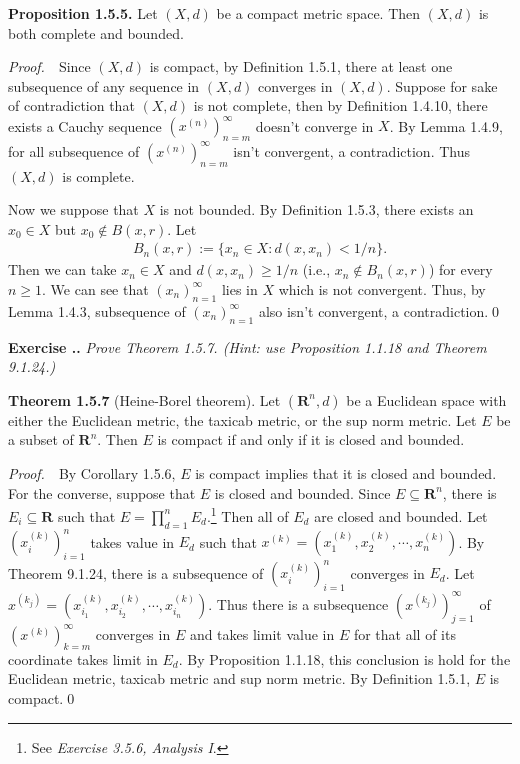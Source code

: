 \documentclass{book}
\newcommand{\pff}{\vspace{.25em}\noindent\emph{Proof.}~~}
\newcommand{\titl}[1]{\noindent\textbf{#1}}
\newcounter{Exercise}[section]
\renewcommand{\theExercise}{\thesection.\arabic{Exercise}.}
\newcommand{\new}{\vspace{1.5em}\noindent\textbf{Exercise \stepcounter{Exercise}\textbf{\theExercise}} }
\begin{document}
\begin{framed}
\titl{Proposition 1.5.5.} Let $(X,d)$ be a compact metric space. Then $(X,d)$ is both complete and bounded.
\end{framed}

\pff Since $(X,d)$ is compact, by Definition 1.5.1, there at least one subsequence of any sequence in $(X,d)$ converges in $(X,d)$. Suppose for sake of contradiction that $(X,d)$ is not complete, then by Definition 1.4.10, there exists a Cauchy sequence $(x^{(n)})_{n=m}^{\infty}$ doesn't converge in $X$. By Lemma 1.4.9, for all subsequence of $(x^{(n)})_{n=m}^{\infty}$ isn't convergent, a contradiction. Thus $(X,d)$ is complete.

Now we suppose that $X$ is not bounded. By Definition 1.5.3, there exists an $x_0\in X$ but $x_0\notin B(x,r)$. Let
    \begin{align*}
        B_n(x,r):=\{x_n\in X:d(x,x_n)<1/n\}.
    \end{align*}
Then we can take $x_n\in X$ and $d(x,x_n)\geq 1/n$ (i.e., $x_n\notin B_n(x,r)$) for every $n\geq 1$. We can see that $(x_n)_{n=1}^{\infty}$ lies in $X$ which is not convergent. Thus, by Lemma 1.4.3, subsequence of $(x_n)_{n=1}^{\infty}$ also isn't convergent, a contradiction.\qed

\new\emph{Prove Theorem 1.5.7. (Hint: use Proposition 1.1.18 and Theorem 9.1.24.)}

\begin{framed}
\titl{Theorem 1.5.7} (Heine-Borel theorem). Let $(\mathbf{R}^n,d)$ be a Euclidean space with either the Euclidean metric, the taxicab metric, or the sup norm metric. Let $E$ be a subset of $\mathbf{R}^n$. Then $E$ is compact if and only if it is closed and bounded.
\end{framed}

\pff By Corollary 1.5.6, $E$ is compact implies that it is closed and bounded. For the converse, suppose that $E$ is closed and bounded. Since $E\subseteq\mathbf{R}^n$, there is $E_i\subseteq\mathbf{R}$ such that $E=\prod_{d=1}^{n}E_d$.\footnote{See \emph{Exercise 3.5.6, Analysis I}.} Then all of $E_d$ are closed and bounded. Let $(x^{(k)}_i)_{i=1}^{n}$ takes value in $E_d$ such that $x^{(k)}=(x^{(k)}_1,x^{(k)}_2,\cdots,x^{(k)}_n)$. By Theorem 9.1.24, there is a subsequence of $(x^{(k)}_{i})_{i=1}^{n}$ converges in $E_d$. Let $x^{(k_j)}=(x^{(k)}_{i_1},x^{(k)}_{i_2},\cdots,x^{(k)}_{i_n})$. Thus there is a subsequence $(x^{(k_j)})_{j=1}^{\infty}$ of $(x^{(k)})_{k=m}^{\infty}$ converges in $E$ and takes limit value in $E$ for that all of its coordinate takes limit in $E_d$. By Proposition 1.1.18, this conclusion is hold for the Euclidean metric, taxicab metric and sup norm metric. By Definition 1.5.1, $E$ is compact.\qed
\end{document}
